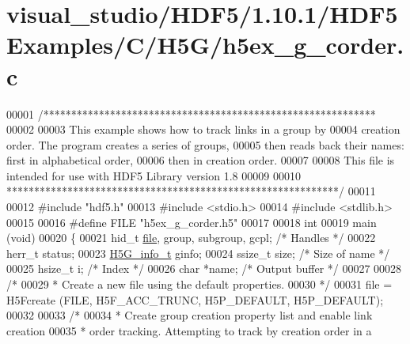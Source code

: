 \hypertarget{visual__studio_2_h_d_f5_21_810_81_2_h_d_f5_examples_2_c_2_h5_g_2h5ex__g__corder_8c_source}{}\section{visual\+\_\+studio/\+H\+D\+F5/1.10.1/\+H\+D\+F5\+Examples/\+C/\+H5\+G/h5ex\+\_\+g\+\_\+corder.c}
\label{visual__studio_2_h_d_f5_21_810_81_2_h_d_f5_examples_2_c_2_h5_g_2h5ex__g__corder_8c_source}

\begin{DoxyCode}
00001 \textcolor{comment}{/************************************************************}
00002 \textcolor{comment}{}
00003 \textcolor{comment}{  This example shows how to track links in a group by}
00004 \textcolor{comment}{  creation order.  The program creates a series of groups,}
00005 \textcolor{comment}{  then reads back their names: first in alphabetical order,}
00006 \textcolor{comment}{  then in creation order.}
00007 \textcolor{comment}{}
00008 \textcolor{comment}{  This file is intended for use with HDF5 Library version 1.8}
00009 \textcolor{comment}{}
00010 \textcolor{comment}{ ************************************************************/}
00011 
00012 \textcolor{preprocessor}{#include "hdf5.h"}
00013 \textcolor{preprocessor}{#include <stdio.h>}
00014 \textcolor{preprocessor}{#include <stdlib.h>}
00015 
00016 \textcolor{preprocessor}{#define FILE       "h5ex\_g\_corder.h5"}
00017 
00018 \textcolor{keywordtype}{int}
00019 main (\textcolor{keywordtype}{void})
00020 \{
00021     hid\_t       \hyperlink{structfile}{file}, group, subgroup, gcpl;        \textcolor{comment}{/* Handles */}
00022     herr\_t      status;
00023     \hyperlink{struct_h5_g__info__t}{H5G\_info\_t}  ginfo;
00024     ssize\_t     size;                               \textcolor{comment}{/* Size of name */}
00025     hsize\_t     i;                                  \textcolor{comment}{/* Index */}
00026     \textcolor{keywordtype}{char}        *name;                              \textcolor{comment}{/* Output buffer */}
00027 
00028     \textcolor{comment}{/*}
00029 \textcolor{comment}{     * Create a new file using the default properties.}
00030 \textcolor{comment}{     */}
00031     file = H5Fcreate (FILE, H5F\_ACC\_TRUNC, H5P\_DEFAULT, H5P\_DEFAULT);
00032 
00033     \textcolor{comment}{/*}
00034 \textcolor{comment}{     * Create group creation property list and enable link creation}
00035 \textcolor{comment}{     * order tracking.  Attempting to track by creation order in a}

\end{DoxyCode}
